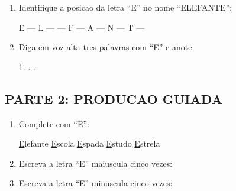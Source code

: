\begin{exercicio}
\begin{enumerate}
  \item Identifique a posicao da letra ``E'' no nome ``ELEFANTE'':
  \begin{center}
  E --- L ---  --- F --- A --- N --- T --- 
  \end{center}

  \item Diga em voz alta tres palavras com ``E'' e anote:
  \begin{center}
  1. \underline{\hspace{4cm}} . \underline{\hspace{4cm}} . \underline{\hspace{4cm}}
  \end{center}
\end{enumerate}

\subsection*{PARTE 2: PRODUCAO GUIADA}

\begin{enumerate}[resume]
  \item Complete com ``E'':
  \begin{center}
  \underline{E}lefante \quad \underline{E}scola \quad \underline{E}spada \quad \underline{E}studo \quad \underline{E}strela
  \end{center}

  \item Escreva a letra ``E'' maiuscula cinco vezes:
  \begin{center}
  \underline{\hspace{1.5cm}} \quad \underline{\hspace{1.5cm}} \quad \underline{\hspace{1.5cm}} \quad \underline{\hspace{1.5cm}} \quad \underline{\hspace{1.5cm}}
  \end{center}

  \item Escreva a letra ``E'' minuscula cinco vezes:
  \begin{center}
  \underline{\hspace{1.5cm}} \quad \underline{\hspace{1.5cm}} \quad \underline{\hspace{1.5cm}} \quad \underline{\hspace{1.5cm}} \quad \underline{\hspace{1.5cm}}
  \end{center}


\end{enumerate}
\end{exercicio}
